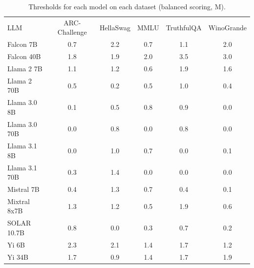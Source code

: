 \begin{table}[h]
\caption{Thresholds for each model on each dataset (balanced scoring, M). }
\label{tab:thresholds_logit_margin_k20_w1}
\centering
\begin{tabular}{l S[table-format=3.1] S[table-format=3.1] S[table-format=3.1] S[table-format=3.1] S[table-format=3.1]}
\toprule
LLM & ARC-Challenge & HellaSwag & MMLU & TruthfulQA & WinoGrande \\ 
\cmidrule(lr){1-1} \cmidrule(lr){2-2} \cmidrule(lr){3-3} \cmidrule(lr){4-4} \cmidrule(lr){5-5} \cmidrule(lr){6-6}
Falcon 7B & 0.7 & 2.2 & 0.7 & 1.1 & 2.0\\
Falcon 40B & 1.8 & 1.9 & 2.0 & 3.5 & 3.0\\
Llama 2 7B & 1.1 & 1.2 & 0.6 & 1.9 & 1.6\\
Llama 2 70B & 0.5 & 0.2 & 0.5 & 1.0 & 0.4\\
Llama 3.0 8B & 0.1 & 0.5 & 0.8 & 0.9 & 0.0\\
Llama 3.0 70B & 0.0 & 0.8 & 0.0 & 0.8 & 0.0\\
Llama 3.1 8B & 0.0 & 1.0 & 0.7 & 0.0 & 0.1\\
Llama 3.1 70B & 0.3 & 1.4 & 0.0 & 0.0 & 0.0\\
Mistral 7B & 0.4 & 1.3 & 0.7 & 0.4 & 0.1\\
Mixtral 8x7B & 1.3 & 1.2 & 0.5 & 1.9 & 0.6\\
SOLAR 10.7B & 0.8 & 0.0 & 0.3 & 0.7 & 0.2\\
Yi 6B & 2.3 & 2.1 & 1.4 & 1.7 & 1.2\\
Yi 34B & 1.7 & 0.9 & 1.4 & 1.7 & 1.9\\
\bottomrule
\end{tabular}
\end{table}
